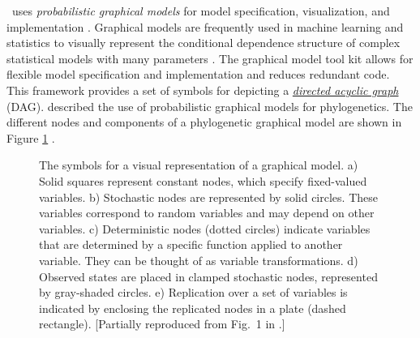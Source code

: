 \RevBayes~uses \textit{probabilistic graphical models} for model specification, visualization, and implementation \citep{hoehnaGM2014}. 
Graphical models are frequently used in machine learning and statistics to visually represent the conditional dependence structure of complex statistical models with many parameters \citep{Gilks1994,lunn00,Jordan2004,Koller2009,Lunn2009}. 
The graphical model tool kit allows for flexible model specification and implementation and reduces redundant code. 
This framework provides a set of symbols for depicting a \href{http://en.wikipedia.org/wiki/Directed_acyclic_graph}{\textit{directed acyclic graph}} (DAG). 
\citet{hoehnaGM2014} described the use of probabilistic graphical models for phylogenetics. 
The different nodes and components of a phylogenetic graphical model are shown in Figure \ref{gmnotation} \citep[Fig. 1 from][]{hoehnaGM2014}. 
\begin{figure}[h!]
\centering
{}
\caption{\small The symbols for a visual representation of a graphical model. 
a) Solid squares represent constant nodes, which specify fixed-valued variables. 
b) Stochastic nodes are represented by solid circles. 
These variables correspond to random variables and may depend on other variables. 
c) Deterministic nodes (dotted circles) indicate variables that are determined by a specific function applied to another variable. 
They can be thought of as variable transformations. 
d) Observed states are placed in clamped stochastic nodes, represented by gray-shaded circles. e) Replication over a set of variables is indicated by enclosing the replicated nodes in a plate (dashed rectangle). 
[Partially reproduced from Fig.~1 in \citet{hoehnaGM2014}.]
}
\label{gmnotation}
\end{figure}


